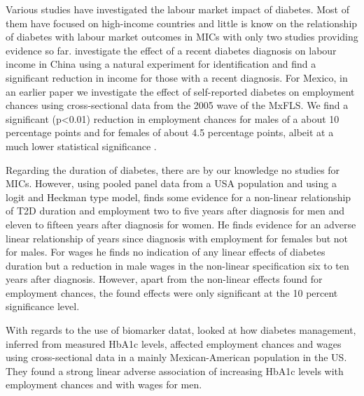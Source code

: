 Various studies have investigated the labour market impact of diabetes.
Most of them have focused on high-income countries and little is know
on the relationship of diabetes with labour market outcomes in \ac{MICs} with only two studies providing evidence
so far. \citet{Liu2014} investigate the effect of a recent diabetes
diagnosis on labour income in China using a natural experiment for
identification and find a significant reduction in income for those
with a recent diagnosis. For Mexico, in an earlier paper we investigate
the effect of self-reported diabetes on employment chances using cross-sectional
data from the 2005 wave of the \ac{MxFLS}. We find a significant
(p<0.01) reduction in employment chances for males of a about 10 percentage
points and for females of about 4.5 percentage points, albeit at a
much lower statistical significance \citep{Seuring2015}. 

Regarding the duration of diabetes, there are by our knowledge no studies for \ac{MICs}. However, using pooled panel data from a
\ac{USA} population and using a logit and Heckman type model, \citet{Minor2013} finds
some evidence for a non-linear relationship of \ac{T2D} duration
and employment two to five years after diagnosis for men and eleven
to fifteen years after diagnosis for women. He finds evidence for an adverse linear relationship of years since diagnosis with employment for females but not for males. For wages he finds no indication of any linear effects of diabetes duration but a reduction in male wages in the non-linear specification six to ten years after diagnosis. However, apart from the non-linear effects found for employment chances, the found effects were only significant at the 10 percent significance level.

With regards to the use of biomarker datat,\citet{BrownIII2011} looked
at how diabetes management, inferred from measured \ac{HbA1c} levels,
affected employment chances and wages using cross-sectional data in
a mainly Mexican-American population in the US. They found a strong linear adverse association of
increasing \ac{HbA1c} levels with employment chances and
with wages for men.

